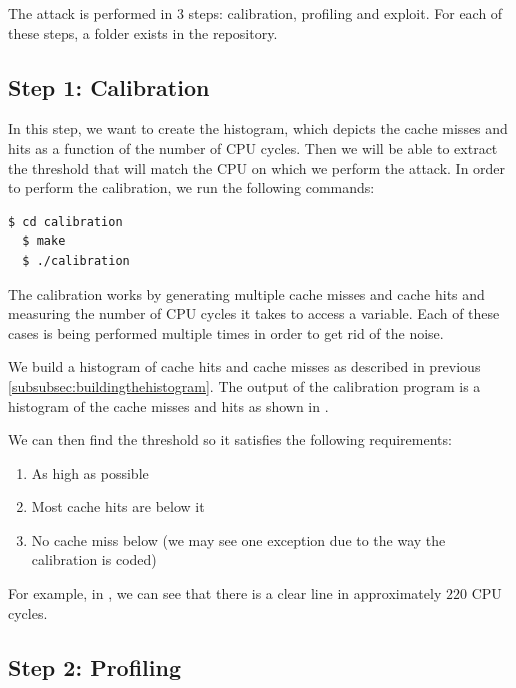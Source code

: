 The attack is performed in 3 steps: calibration, profiling and exploit. For each of these steps, a folder exists in the repository.

\subsection{Step 1: Calibration}
\label{subsec:step1calibration}

In this step, we want to create the histogram, which depicts the cache misses and hits as a function of the number of CPU cycles. Then we will be able to extract the threshold that will match the CPU on which we perform the attack. In order to perform the calibration, we run the following commands:

\begin{lstlisting}[language=bash]
  $ cd calibration
  $ make
  $ ./calibration
\end{lstlisting}
The calibration works by generating multiple cache misses and cache hits and measuring the number of CPU cycles it takes to access a variable. Each of these cases is being performed multiple times in order to get rid of the noise.

\noindent We build a histogram of cache hits and cache misses as described in
previous \cref{subsubsec:buildingthehistogram}. The output of the calibration
program is a histogram of the cache misses and hits as shown in
.

We can then find the threshold so it satisfies the following requirements:
\begin{enumerate}
    \item As high as possible
    \item Most cache hits are below it
    \item No cache miss below (we may see one exception due to the way the
    calibration is coded)
\end{enumerate}

For example, in , we can see that there is a
clear line in approximately $220$ CPU cycles.

\subsection{Step 2: Profiling}
\label{subsec:step2profiling}

